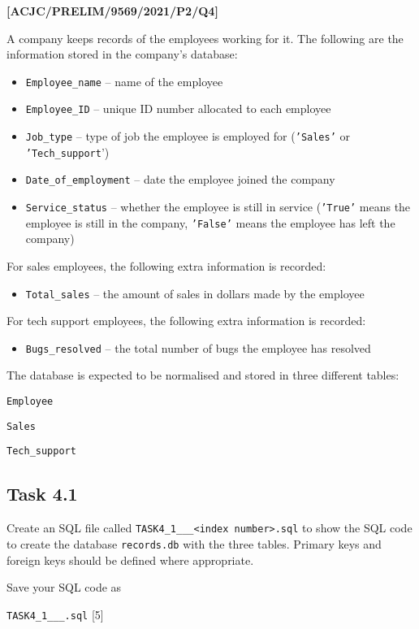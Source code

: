 \item \textbf{{[}ACJC/PRELIM/9569/2021/P2/Q4{]} }

A company keeps records of the employees working for it. The following
are the information stored in the company\textquoteright s database:
\begin{itemize}
\item \texttt{Employee\_name} -- name of the employee 
\item \texttt{Employee\_ID} -- unique ID number allocated to each employee 
\item \texttt{Job\_type} -- type of job the employee is employed for (\texttt{'Sales'}
or \texttt{'Tech\_support}') 
\item \texttt{Date\_of\_employment} -- date the employee joined the company 
\item \texttt{Service\_status} -- whether the employee is still in service
(\texttt{'True'} means the employee is still in the company, \texttt{'False'}
means the employee has left the company) 
\end{itemize}
For sales employees, the following extra information is recorded:
\begin{itemize}
\item \texttt{Total\_sales} -- the amount of sales in dollars made by the
employee 
\end{itemize}
For tech support employees, the following extra information is recorded:
\begin{itemize}
\item \texttt{Bugs\_resolved} -- the total number of bugs the employee
has resolved 
\end{itemize}
The database is expected to be normalised and stored in three different
tables:

\texttt{Employee }

\texttt{Sales }

\texttt{Tech\_support}

\subsection*{Task 4.1}

Create an SQL file called \texttt{TASK4\_1\_<your name>\_<centre number>\_<index
number>.sql} to show the SQL code to create the database \texttt{records.db}
with the three tables. Primary keys and foreign keys should be defined
where appropriate.

Save your SQL code as 

\texttt{TASK4\_1\_<your name>\_<centre number>\_<index number>.sql}
\hfill{}{[}5{]}

